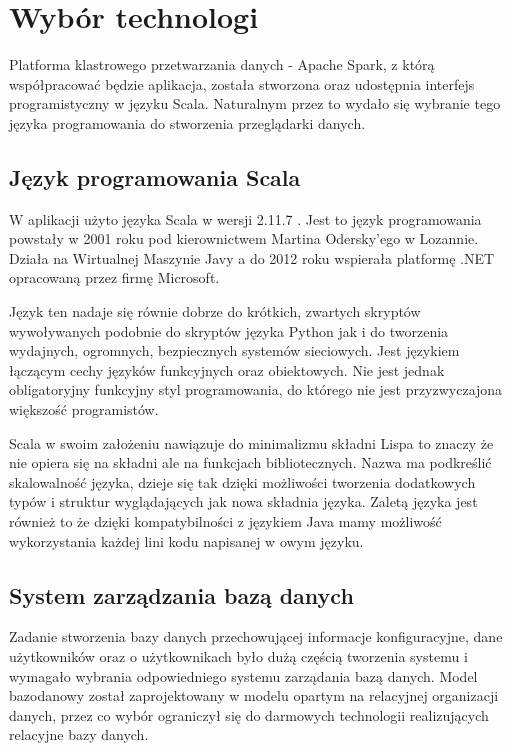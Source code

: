 \documentclass[a4paper,12pt,twoside]{article}
\begin{document}
\section{Wybór technologi}

Platforma klastrowego przetwarzania danych - Apache Spark\cite{spark}, z którą współpracować będzie aplikacja, została stworzona oraz udostępnia interfejs programistyczny w języku Scala.
Naturalnym przez to wydało się wybranie tego języka programowania do stworzenia przeglądarki danych.

  
\subsection{Język programowania Scala}
W aplikacji użyto języka Scala w wersji 2.11.7 \cite{jezykScala}. Jest to język programowania powstały w 2001 roku pod kierownictwem Martina Odersky'ego w Lozannie.
Działa na Wirtualnej Maszynie Javy a do 2012 roku wspierała platformę .NET opracowaną przez firmę Microsoft. 

Język ten nadaje się równie dobrze do krótkich, zwartych skryptów  wywoływanych podobnie do skryptów języka Python jak i do tworzenia wydajnych, ogromnych, bezpiecznych systemów sieciowych.
Jest językiem łączącym cechy języków funkcyjnych oraz obiektowych. 
Nie jest jednak obligatoryjny funkcyjny styl programowania, do którego nie jest przyzwyczajona większość programistów.

 Scala w swoim założeniu nawiązuje do minimalizmu składni Lispa to znaczy że nie opiera się na składni ale na funkcjach bibliotecznych. Nazwa ma podkreślić skalowalność języka, dzieje się tak dzięki możliwości tworzenia dodatkowych typów i struktur wyglądających jak nowa składnia języka.
Zaletą języka jest również to że dzięki kompatybilności z językiem Java mamy możliwość wykorzystania każdej lini kodu napisanej w owym języku.

\newpage
\subsection{System zarządzania bazą danych}  
Zadanie stworzenia bazy danych przechowującej informacje konfiguracyjne, dane użytkowników oraz o użytkownikach było dużą częścią tworzenia systemu i
wymagało wybrania odpowiedniego systemu zarządania bazą danych.
Model bazodanowy został zaprojektowany w modelu opartym na relacyjnej organizacji danych, przez co wybór ograniczył się do
darmowych technologii realizujących relacyjne bazy danych.
\end{document}
